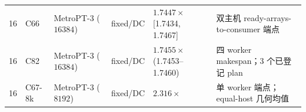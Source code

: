 \begin{table}[!t]
\begin{tabular}{@{}cllllp{4.0cm}@{}}
16 & C66 & MetroPT-3 ($16384$) & fixed/DC & $1.7447\times$ [1.7434, 1.7467] & 双主机 ready-arrays-to-consumer 端点 \\
16 & C82 & MetroPT-3 ($16384$) & fixed/DC & $1.7455\times$ (1.7453--1.7460) & 四 worker makespan；3 个已登记 plan \\
16 & C67-8k & MetroPT-3 ($8192$) & fixed/DC & $2.316\times$ & 单 worker 端点；equal-host 几何均值 \\
\bottomrule
\end{tabular}
\end{table}
